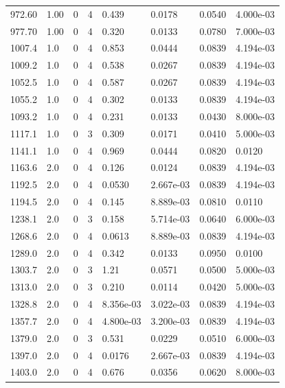 \documentclass[preview]{standalone}
\begin{document}
{{{\begin{tabular}{L{1.2cm}C{1.2cm} C{0.3cm}C{0.5cm} C{1.4cm}C{1.4cm} C{1.4cm}C{1.4cm}}
  972.60  &  1.00  & 0     &  4 &  0.439  & 0.0178  & 0.0540 &  4.000e-03   \\ 
  977.70  &  1.00  & 0     &  4 &  0.320  & 0.0133  & 0.0780 &  7.000e-03   \\ 
  1007.4  &   1.0  & 0     &  4 &  0.853  & 0.0444  & 0.0839 &  4.194e-03   \\ 
  1009.2  &   1.0  & 0     &  4 &  0.538  & 0.0267  & 0.0839 &  4.194e-03   \\ 
  1052.5  &   1.0  & 0     &  4 &  0.587  & 0.0267  & 0.0839 &  4.194e-03   \\ 
  1055.2  &   1.0  & 0     &  4 &  0.302  & 0.0133  & 0.0839 &  4.194e-03   \\ 
  1093.2  &   1.0  & 0     &  4 &  0.231  & 0.0133  & 0.0430 &  8.000e-03   \\ 
  1117.1  &   1.0  & 0     &  3 &  0.309  & 0.0171  & 0.0410 &  5.000e-03   \\ 
  1141.1  &   1.0  & 0     &  4 &  0.969  & 0.0444  & 0.0820 &  0.0120   \\ 
  1163.6  &   2.0  & 0     &  4 &  0.126  & 0.0124  & 0.0839 &  4.194e-03   \\ 
  1192.5  &   2.0  & 0     &  4 &  0.0530  & 2.667e-03  & 0.0839 &  4.194e-03   \\ 
  1194.5  &   2.0  & 0     &  4 &  0.145  & 8.889e-03  & 0.0810 &  0.0110   \\ 
  1238.1  &   2.0  & 0     &  3 &  0.158  & 5.714e-03  & 0.0640 &  6.000e-03   \\ 
  1268.6  &   2.0  & 0     &  4 &  0.0613  & 8.889e-03  & 0.0839 &  4.194e-03   \\ 
  1289.0  &   2.0  & 0     &  4 &  0.342  & 0.0133  & 0.0950 &  0.0100   \\ 
  1303.7  &   2.0  & 0     &  3 &  1.21  & 0.0571  & 0.0500 &  5.000e-03   \\ 
  1313.0  &   2.0  & 0     &  3 &  0.210  & 0.0114  & 0.0420 &  5.000e-03   \\ 
  1328.8  &   2.0  & 0     &  4 &  8.356e-03  & 3.022e-03  & 0.0839 &  4.194e-03   \\ 
  1357.7  &   2.0  & 0     &  4 &  4.800e-03  & 3.200e-03  & 0.0839 &  4.194e-03   \\ 
  1379.0  &   2.0  & 0     &  3 &  0.531  & 0.0229  & 0.0510 &  6.000e-03   \\ 
  1397.0  &   2.0  & 0     &  4 &  0.0176  & 2.667e-03  & 0.0839 &  4.194e-03   \\ 
  1403.0  &   2.0  & 0     &  4 &  0.676  & 0.0356  & 0.0620 &  8.000e-03   \\ 

\end{tabular}}}}
\end{document}
